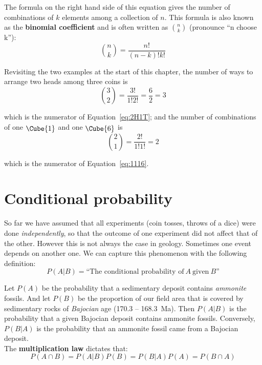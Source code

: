 The formula on the right hand side of this equation gives the number
of combinations of $k$ elements among a collection of $n$.  This
formula is also known as the \textbf{binomial coefficient} and is
often written as $\binom{n}{k}$ (pronounce ``n choose k''):
\begin{equation}
  \binom{n}{k} = \frac{n!}{(n-k)!k!}
  \label{eq:nchoosek}
\end{equation}

Revisiting the two examples at the start of this chapter, the number
of ways to arrange two heads among three coins is
\[
\binom{3}{2} = \frac{3!}{1!2!} = \frac{6}{2} = 3
\]

\noindent which is the numerator of Equation~\ref{eq:2H1T}; and the
number of combinations of one $\raisebox{-2pt}{\Cube{1}}$ and one
$\raisebox{-2pt}{\Cube{6}}$ is
\[
\binom{2}{1} = \frac{2!}{1!1!} = 2
\]

\noindent which is the numerator of Equation~\ref{eq:1116}.

\section{Conditional probability}
\label{sec:conditionalprobability}

So far we have assumed that all experiments (coin tosses, throws of a
dice) were done \emph{independently}, so that the outcome of one
experiment did not affect that of the other. However this is not
always the case in geology. Sometimes one event depends on another
one. We can capture this phenomenon with the following definition:
\begin{equation}
P(A|B) = \mbox{``The conditional probability of}~A~\mbox{given}~B\mbox{''}
\end{equation}

Let $P(A)$ be the probability that a sedimentary deposit contains
\emph{ammonite} fossils.  And let $P(B)$ be the proportion of our
field area that is covered by sedimentary rocks of \emph{Bajocian} age
(170.3 -- 168.3~Ma). Then $P(A|B)$ is the probability that a given
Bajocian deposit contains ammonite fossils. Conversely, $P(B|A)$ is
the probability that an ammonite fossil came from a Bajocian
deposit.\\

The \textbf{multiplication law} dictates that:
\begin{equation}
  P({A}\cap{B}) = P(A|B) P(B) = P(B|A) P(A) = P({B}\cap{A})
  \label{eq:PA&B}
\end{equation}

